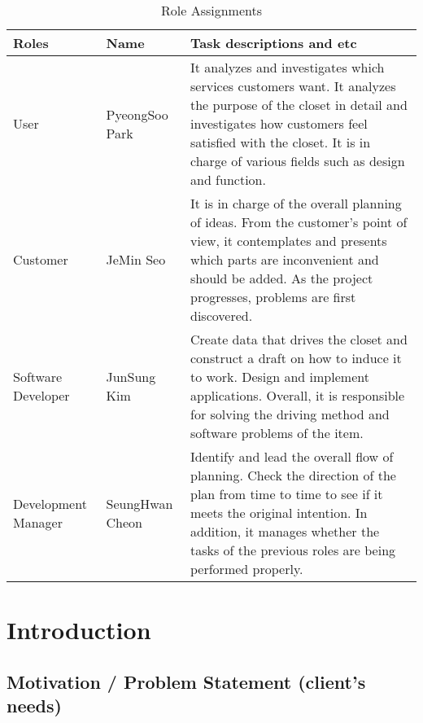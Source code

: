 \documentclass[conference]{IEEEtran}
\begin{document}
\begin{table}
\caption{Role Assignments}
\label{t1}
\begin{tabular}{|p{2cm}|p{2cm}|p{3cm}|}
\noalign{\smallskip}\noalign{\smallskip}\hline
Roles & Name & Task descriptions and etc \\
\hline
User & PyeongSoo Park & It analyzes and investigates which services customers want. It analyzes the purpose of the closet in detail and investigates how customers feel satisfied with the closet. It is in charge of various fields such as design and function.  \\
\hline
Customer & JeMin Seo & It is in charge of the overall planning of ideas. From the customer's point of view, it contemplates and presents which parts are inconvenient and should be added. As the project progresses, problems are first discovered.  \\
\hline
Software Developer  & JunSung Kim & Create data that drives the closet and construct a draft on how to induce it to work. Design and implement applications. Overall, it is responsible for solving the driving method and software problems of the item.  \\
\hline
Development Manager  & SeungHwan Cheon & Identify and lead the overall flow of planning. Check the direction of the plan from time to time to see if it meets the original intention. In addition, it manages whether the tasks of the previous roles are being performed properly.  \\
\hline
\end{tabular}
\end{table}

\section{Introduction}

\subsection{Motivation / Problem Statement (client’s needs)}
\end{document}
